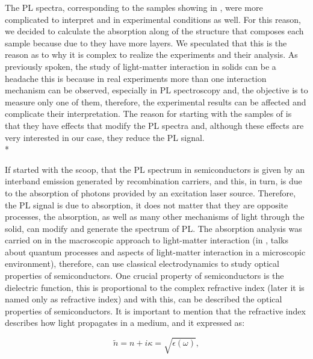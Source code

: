 The \gls{PL} spectra, corresponding to the samples showing in ,  were more complicated to interpret and in experimental conditions as well. For this reason, we decided to calculate the absorption along of the structure that composes each sample because due to they have more layers. We speculated that this is the reason as to why it is  complex to realize the experiments and their analysis. As previously spoken, the study of light-matter interaction in solids can be a headache this is because in real experiments more than one interaction mechanism can be observed, especially in PL spectroscopy and, the objective is to measure only one of them, therefore, the experimental results can be affected and complicate their interpretation. The reason for starting with the samples of  is that they have effects that modify the PL spectra and, although these effects are very interested in our case, they reduce the PL signal.\\* 

If started with the scoop, that the PL spectrum in semiconductors is given by an interband emission generated by recombination carriers, and this, in turn, is due to the absorption of photons provided by an excitation laser source. Therefore, the PL signal is due to absorption, it does not matter that they are opposite processes, the absorption, as well as many other mechanisms of light through the solid, can modify and generate the spectrum of PL. The absorption analysis was carried on in the macroscopic approach to light-matter interaction (in , talks about quantum processes and aspects of light-matter interaction in a microscopic environment), therefore,   can use classical electrodynamics to study optical properties of semiconductors. One crucial property of semiconductors is the dielectric function, this is proportional to the complex refractive index (later it is named only as refractive index) and with this,  can be described the optical properties of semiconductors. It is important to mention that the refractive index describes how light propagates  in a medium, and it expressed as\cite{chuang1995physics,jimenez2016spectroscopic}:

\begin{equation}
	\tilde{n}=n + i\kappa = \sqrt{\epsilon(\omega)},
	\label{eq:chapter-3-PL-complex-refractive-index}
\end{equation}

